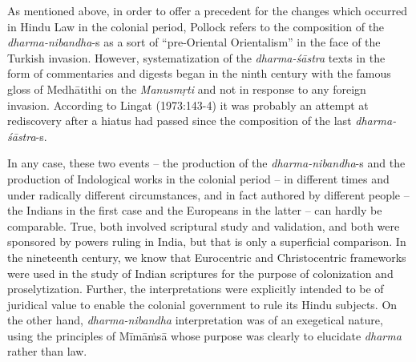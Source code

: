 As mentioned above, in order to offer a precedent for the changes which occurred in Hindu Law in the colonial period, Pollock refers to the composition of the {\sl dharma-nibandha}-s as a sort of “pre-Oriental Orientalism” in the face of the Turkish invasion. However, systematization of the {\sl dharma-śāstra} texts in the form of commentaries and digests began in the ninth century with the famous gloss of Medhātithi on the {\sl Manusmṛti} and not in response to any foreign invasion. According to Lingat (1973:143-4) it was probably an attempt at rediscovery after a hiatus had passed since the composition of the last {\sl dharma-śāstra}-s.

In any case, these two events – the production of the {\sl dharma-nibandha}-s and the production of Indological works in the colonial period – in different times and under radically different circumstances, and in fact authored by different people – the Indians in the first case and the Europeans in the latter – can hardly be comparable. True, both involved scriptural study and validation, and both were sponsored by powers ruling in India, but that is only a superficial comparison. In the nineteenth century, we know that Eurocentric and Christocentric frameworks were used in the study of Indian scriptures for the purpose of colonization and proselytization. Further, the interpretations were explicitly intended to be of juridical value to enable the colonial government to rule its Hindu subjects. On the other hand, {\sl dharma-nibandha} interpretation was of an exegetical nature, using the principles of Mīmāṁsā whose purpose was clearly to elucidate {\sl dharma} rather than law.


